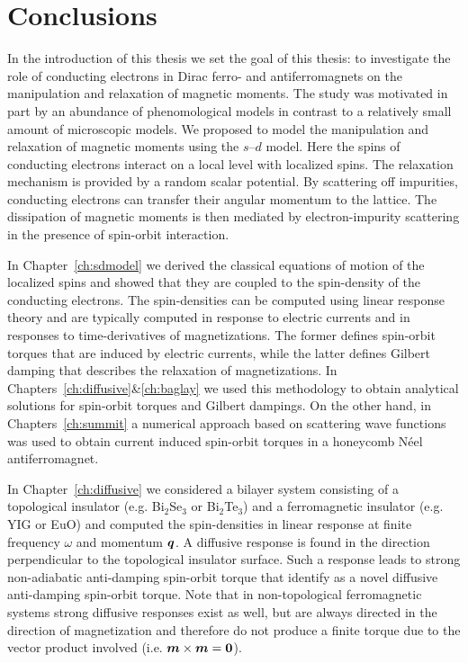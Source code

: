 \chapter{Conclusions}
In the introduction of this thesis we set the goal of this thesis: to investigate the role of conducting electrons in Dirac ferro- and antiferromagnets on the manipulation and relaxation of magnetic moments. The study was motivated in part by an abundance of phenomological models in contrast to a relatively small amount of microscopic models. We proposed to model the manipulation and relaxation of magnetic moments using the $s$--$d$ model. Here the spins of conducting electrons interact on a local level with localized spins. The relaxation mechanism is provided by a random scalar potential. By scattering off impurities, conducting electrons can transfer their angular momentum to the lattice. The dissipation of magnetic moments is then mediated by electron-impurity scattering in the presence of spin-orbit interaction. 

In Chapter~\ref{ch:sdmodel} we derived the classical equations of motion of the localized spins and showed that they are coupled to the spin-density of the conducting electrons. The spin-densities can be computed using linear response theory and are typically computed in response to electric currents and in responses to time-derivatives of magnetizations. The former defines spin-orbit torques that are induced by electric currents, while the latter defines Gilbert damping that describes the relaxation of magnetizations. In Chapters~\ref{ch:diffusive}\&\ref{ch:baglay} we used this methodology to obtain analytical solutions for spin-orbit torques and Gilbert dampings. On the other hand, in Chapters~\ref{ch:summit} a numerical approach based on scattering wave functions was used to obtain current induced spin-orbit torques in a honeycomb N\'eel antiferromagnet. 

In Chapter~\ref{ch:diffusive} we considered a bilayer system consisting of a topological insulator (e.g. Bi$_2$Se$_3$ or Bi$_2$Te$_3$) and a ferromagnetic insulator (e.g. YIG or EuO) and computed the spin-densities in linear response at finite frequency $\omega$ and momentum $\boldsymbol{q}$. A diffusive response is found in the direction perpendicular to the topological insulator surface. Such a response leads to strong non-adiabatic anti-damping spin-orbit torque that identify as a novel diffusive anti-damping spin-orbit torque. Note that in non-topological ferromagnetic systems strong diffusive responses exist as well, but are always directed in the direction of magnetization and therefore do not produce a finite torque due to the vector product involved (i.e. $\boldsymbol{m}\times\boldsymbol{m}=\boldsymbol{0}$).

